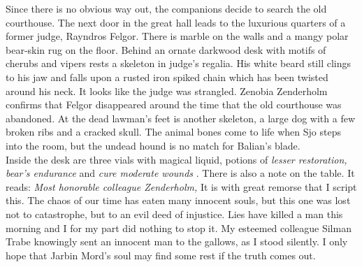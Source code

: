 Since there is no obvious way out, the companions decide to search the old courthouse. The next door in the great hall leads to the luxurious quarters of a former judge, Rayndros Felgor. There is marble on the walls and a mangy polar bear-skin rug on the floor. Behind an ornate darkwood desk with motifs of cherubs and vipers rests a skeleton in judge's regalia. His white beard still clings to his jaw and falls upon a rusted iron spiked chain which has been twisted around his neck. It looks like the judge was strangled. Zenobia Zenderholm confirms that Felgor disappeared around the time that the old courthouse was abandoned. At the dead lawman's feet is another skeleton, a large dog with a few broken ribs and a cracked skull. The animal bones come to life when Sjo steps into the room, but the undead hound is no match for Balian's blade.\\

Inside the desk are three vials with magical liquid, potions of {\itshape lesser restoration, bear's endurance} and  {\itshape cure moderate wounds} . There is also a note on the table. It reads:  {\itshape Most honorable colleague Zenderholm,}  It is with great remorse that I script this. The chaos of our time has eaten many innocent souls, but this one was lost not to catastrophe, but to an evil deed of injustice. Lies have killed a man this morning and I for my part did nothing to stop it. My esteemed colleague Silman Trabe knowingly sent an innocent man to the gallows, as I stood silently. I only hope that Jarbin Mord's soul may find some rest if the truth comes out.\\

